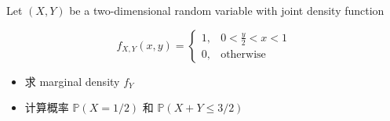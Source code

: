 \documentclass{qlnotes-export}
\begin{document}
\begin{example}

Let \((X,Y)\) be a two-dimensional random variable with joint density function

\[f_{X,Y}(x,y) = \left\{ \begin{matrix}
{1,} & {0 < \frac{y}{2} < x < 1} \\
{0,} & \text{otherwise}
\end{matrix} \right.\]

\begin{itemize}
\item
  求 marginal density \(f_{Y}\)
\item
  计算概率 \({\mathbb{P}}(X = 1/2)\) 和 \({\mathbb{P}}(X + Y \leq 3/2)\)
\end{itemize}

\end{example}
\end{document}
